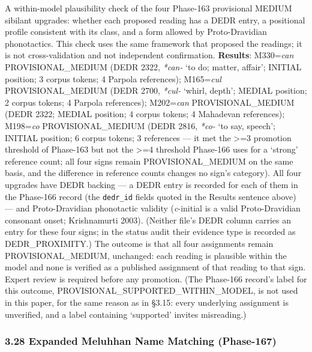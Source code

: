 \documentclass[
]{article}
\newcounter{none} %
\begin{document}
A within-model plausibility check of the four Phase-163 provisional MEDIUM sibilant upgrades: whether each proposed reading has a DEDR entry, a positional profile consistent with its class, and a form allowed by Proto-Dravidian phonotactics. This check uses the same framework that proposed the readings; it is not cross-validation and not independent confirmation. \textbf{Results}:
M330=\emph{can} PROVISIONAL\_MEDIUM (DEDR 2322, \emph{*can-} `to do; matter, affair'; INITIAL position; 3 corpus tokens; 4 Parpola references); M165=\emph{cul} PROVISIONAL\_MEDIUM (DEDR 2700, \emph{*cul-} `whirl, depth'; MEDIAL position; 2 corpus tokens; 4 Parpola references); M202=\emph{can} PROVISIONAL\_MEDIUM (DEDR 2322; MEDIAL position; 4 corpus tokens; 4 Mahadevan references); M198=\emph{co} PROVISIONAL\_MEDIUM (DEDR 2816, \emph{*co-} `to say, speech'; INITIAL position; 6 corpus tokens; 3 references --- it met the \textgreater{}=3 promotion threshold of Phase-163 but not the \textgreater{}=4 threshold Phase-166 uses for a `strong' reference count; all four signs remain PROVISIONAL\_MEDIUM on the same basis, and the difference in reference counts changes no sign's category). All four upgrades have DEDR backing --- a DEDR entry is recorded for each of them in the Phase-166 record (the \texttt{dedr\_id} fields quoted in the Results sentence above) --- and Proto-Dravidian phonotactic validity (\emph{c}-initial is a valid Proto-Dravidian consonant onset; Krishnamurti 2003). (Neither file's DEDR column carries an entry for these four signs; in the status audit their evidence type is recorded as DEDR\_PROXIMITY.) The outcome is that all four assignments remain PROVISIONAL\_MEDIUM, unchanged: each reading is plausible within the model and none is verified as a published assignment of that reading to that sign. Expert review is required before any promotion. (The Phase-166 record's label for this outcome, PROVISIONAL\_SUPPORTED\_WITHIN\_MODEL, is not used in this paper, for the same reason as in §3.15: every underlying assignment is unverified, and a label containing `supported' invites misreading.)

\subsubsection{3.28 Expanded Meluhhan Name Matching
(Phase-167)}\label{expanded-meluhhan-name-matching-phase-167}
\end{document}
